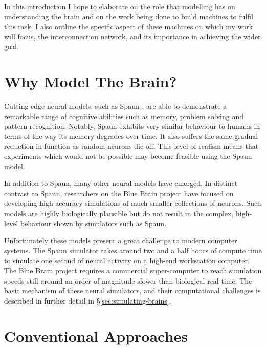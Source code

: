 	In this introduction I hope to elaborate on the role that modelling has on
	understanding the brain and on the work being done to build machines to fulfil
	this task. I also outline the specific aspect of these machines on which my
	work will focus, the interconnection network, and its importance in achieving
	the wider goal.
	
	\section{Why Model The Brain?}
	
		
		
		Cutting-edge neural models, such as Spaun \cite{eliasmith12}, are able to
		demonstrate a remarkable range of cognitive abilities such as memory,
		problem solving and pattern recognition. Notably, Spaun exhibits very
		similar behaviour to humans in terms of the way its memory degrades over
		time. It also suffers the same gradual reduction in function as random
		neurons die off. This level of realism means that experiments which would
		not be possible may become feasible using the Spaun model.
		
		In addition to Spaun, many other neural models have emerged. In distinct
		contrast to Spaun, researchers on the Blue Brain project \cite{markram06}
		have focused on developing high-accuracy simulations of much smaller
		collections of neurons. Such models are highly biologically plausible but
		do not result in the complex, high-level behaviour shown by simulators such
		as Spaun.
		
		Unfortunately these models present a great challenge to modern computer
		systems. The Spaun simulator takes around two and a half hours of compute
		time to simulate one second of neural activity on a high-end workstation
		computer. The Blue Brain project requires a commercial super-computer to
		reach simulation speeds still around an order of magnitude slower than
		biological real-time. The basic mechanism of these neural simulators, and
		their computational challenges is described in further detail in
		\S\ref{sec:simulating-brains}.
	
	\section{Conventional Approaches}
	
		

